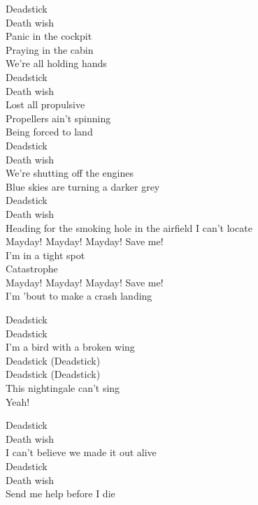 
Deadstick\\
Death wish\\
Panic in the cockpit\\
Praying in the cabin\\
We're all holding hands\\
Deadstick\\
Death wish\\
Lost all propulsive\\
Propellers ain't spinning\\
Being forced to land\\
Deadstick\\
Death wish\\
We're shutting off the engines\\
Blue skies are turning a darker grey\\
Deadstick\\
Death wish\\
Heading for the smoking hole in the airfield I can't locate\\

Mayday! Mayday! Mayday! Save me!\\
I'm in a tight spot\\
Catastrophe\\
Mayday! Mayday! Mayday! Save me!\\
I'm 'bout to make a crash landing\\


Deadstick\\
Deadstick\\
I'm a bird with a broken wing\\
Deadstick (Deadstick)\\
Deadstick (Deadstick)\\
This nightingale can't sing\\
Yeah!\\


Deadstick\\
Death wish\\
I can't believe we made it out alive\\
Deadstick\\
Death wish\\
Send me help before I die\\


